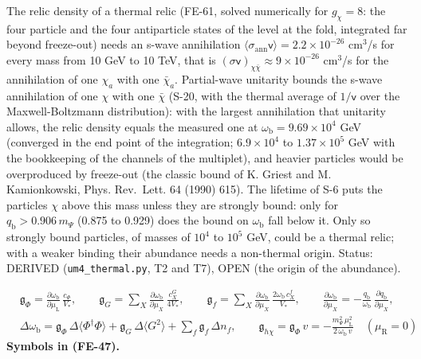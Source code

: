 \documentclass[
  10pt,
]{article}
\begin{document}
The relic density of a thermal relic (FE-61, solved numerically for
\(g_\chi = 8\): the four particle and the four antiparticle states of
the level at the fold, integrated far beyond freeze-out) needs an s-wave
annihilation
\(\langle\sigma_{\mathrm{ann}}\mathsf{v}\rangle = 2.2\times10^{-26}\)
cm\(^3\)/s for every mass from 10 GeV to 10 TeV, that is
\((\sigma\mathsf{v})_{\chi\bar\chi} \approx 9\times10^{-26}\) cm\(^3\)/s
for the annihilation of one \(\chi_a\) with one \(\bar\chi_a\).
Partial-wave unitarity bounds the s-wave annihilation of one \(\chi\)
with one \(\bar\chi\) (S-20, with the thermal average of
\(1/\mathsf{v}\) over the Maxwell-Boltzmann distribution): with the
largest annihilation that unitarity allows, the relic density equals the
measured one at \(\omega_{\mathrm{b}} = 9.69\times10^4\) GeV (converged
in the end point of the integration; \(6.9\times10^4\) to
\(1.37\times10^5\) GeV with the bookkeeping of the channels of the
multiplet), and heavier particles would be overproduced by freeze-out
(the classic bound of K. Griest and M. Kamionkowski, Phys. Rev.~Lett. 64
(1990) 615). The lifetime of S-6 puts the particles \(\chi\) above this
mass unless they are strongly bound: only for
\(q_{\mathrm{b}} > 0.906\,m_\Psi\) (0.875 to 0.929) does the bound on
\(\omega_{\mathrm{b}}\) fall below it. Only so strongly bound particles,
of masses of \(10^4\) to \(10^5\) GeV, could be a thermal relic; with a
weaker binding their abundance needs a non-thermal origin. Status:
DERIVED (\texttt{um4\_thermal.py}, T2 and T7), OPEN (the origin of the
abundance).

\[
\begin{aligned}
&\mathfrak{g}_{\Phi} = \frac{\partial\omega_{\mathrm{b}}}{\partial\mu_{\mathrm{L}}}\,\frac{c_\Phi}{V_*},\qquad
 \mathfrak{g}_{G} = \sum_X\frac{\partial\omega_{\mathrm{b}}}{\partial\mu_X}\,\frac{c^{G}_X}{4V_*},\qquad
 \mathfrak{g}_{f} = \sum_X\frac{\partial\omega_{\mathrm{b}}}{\partial\mu_X}\,\frac{2\omega_{\mathrm{b}}\,c^{f}_X}{V_*},\qquad
 \frac{\partial\omega_{\mathrm{b}}}{\partial\mu_X} = -\frac{q_{\mathrm{b}}}{\omega_{\mathrm{b}}}\,\frac{\partial q_{\mathrm{b}}}{\partial\mu_X},\\
&\Delta\omega_{\mathrm{b}} = \mathfrak{g}_{\Phi}\,\Delta\langle\Phi^\dagger\Phi\rangle + \mathfrak{g}_{G}\,\Delta\langle G^2\rangle + \sum_f\mathfrak{g}_{f}\,\Delta n_f,\qquad
 \mathfrak{g}_{h\chi} = \mathfrak{g}_{\Phi}\,v = -\frac{m_\Psi^2\,\mu_{\mathrm{L}}^2}{2\,\omega_{\mathrm{b}}\,v}\quad(\mu_{\mathrm{R}} = 0)
\end{aligned} \tag{FE-47}
\] \textbf{Symbols in (FE-47).}
\end{document}
